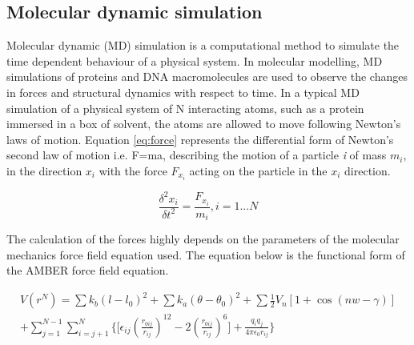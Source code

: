 		\subsection{Molecular dynamic simulation}
		\label{sec:MolecularDynamicSimulation}
		Molecular dynamic (MD) simulation is a computational method to simulate the time dependent behaviour of a physical system. In molecular modelling, MD simulations of proteins and DNA macromolecules are used to observe the changes in forces and structural dynamics with respect to time. In a typical MD simulation of a physical system of N interacting atoms, such as a protein immersed in a box of solvent, the atoms are allowed to move following Newton's laws of motion. Equation \ref{eq:force} represents the differential form of Newton's second law of motion i.e. F=ma, describing the motion of a particle \textit{i} of mass $ m_{i} $, in the direction $ x_{i} $ with the force $ F_{x_i} $ acting on the particle in the $ x_{i} $ direction. %
		
		\begin{equation}
		\label{eq:force}
			\frac{\delta^2x_i}{\delta t^2} =  \frac{F_{x_i}}{m_i}, i=1 ... N
		\end{equation}
		
%		
		
		\noindent The calculation of the forces highly depends on the parameters of the molecular mechanics force field equation used. The equation below is the functional form of the AMBER force field equation.
		
		\begin{equation}
		\label{eq:AMBER}
		\begin{gathered}
			V(r^N) = \sum k_b (l-l_0)^2 + \sum k_a (\theta - \theta_0)^2 + \sum \frac{1}{2} V_n [1 + \cos(nw - \gamma)] \\ 
			+ \sum_{j=1}^{N-1} \sum_{i=j+1}^{N} \Biggl \lbrace \Biggl[\epsilon_{ij} \left(  \frac{r_{0ij}}{r_{ij}} \right)^{12} - 2 \left(\frac{r_{0ij}}{r_{ij}}\right)^6 \Biggl] + \frac{q_i q_j}{4 \pi \epsilon_0 r_{ij}} \Biggl\rbrace
		\end{gathered}			
		\end{equation}
		
